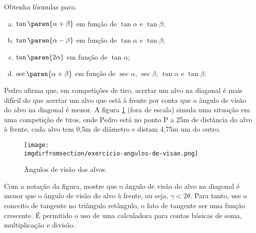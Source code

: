 \begin{exercise}
    Obtenha fórmulas para: 
    \begin{enumerate}[a)]
      \item $\tan\paren{\alpha + \beta}$ em função de $\tan \alpha$ e $\tan \beta$;
      \item $\tan\paren{\alpha - \beta}$ em função de $\tan \alpha$ e $\tan \beta$;
      \item $\tan\paren{2 \alpha}$ em função de $\tan \alpha$;
      \item $\sec \paren{\alpha + \beta}$ em função de $\sec \alpha$, $\sec \beta$, $\tan \alpha$ e $\tan \beta$.
    \end{enumerate}
\end{exercise}

\begin{exercise}
  Pedro afirma que, em competições de tiro, acertar um alvo na diagonal é mais difícil do que acertar um alvo que está à frente por conta que o ângulo de visão do alvo na diagonal é menor. A figura \ref{fig:angulos-de-visao} (fora de escala) simula uma situação em uma competição de tiros, onde Pedro está no ponto P a 25m de distância do alvo à frente, cada alvo tem 0,5m de diâmetro e distam 4,75m um do outro.
        \begin{figure}[H]
          \centering 
          \texttt{[image: \\imgdirfromsection/exercicio-angulos-de-visao.png]} 
          \caption{Ângulos de visão dos alvos.}
          \label{fig:angulos-de-visao}
        \end{figure}
        Com a notação da figura, mostre que o ângulo de visão do alvo na diagonal é menor que o ângulo de visão do alvo à frente, ou seja, $\gamma < 2\theta$. Para tanto, use o conceito de tangente no triângulo retângulo, o fato de tangente ser uma função crescente. É permitido o uso de uma calculadora para contas básicas de soma, multiplicação e divisão.
\end{exercise}
